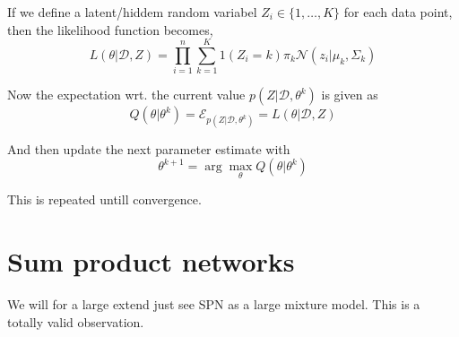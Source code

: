 If we define a latent/hiddem random variabel $Z_i \in \{1,\dots, K\}$ for each data point, then 
the likelihood function becomes, 
$$L(\theta|\mathcal{D}, Z) = \prod_{i=1}^n \sum_{k=1}^K 1(Z_i = k) \pi_k \mathcal{N}(z_i|\mu_k, \Sigma_k)$$

Now the expectation wrt. the current value $p(Z|\mathcal{D}, \theta^k)$ is given as 
$$Q(\theta|\theta^k) = \mathcal{E}_{p(Z|\mathcal{D}, \theta^k)}=L(\theta|\mathcal{D}, Z) $$

And then update the next parameter estimate with
$$\theta^{k+1} = \arg \max_{\theta} Q(\theta|\theta^k)$$

This is repeated untill convergence. 


\section{Sum product networks}
We will for a large extend just see SPN as a large mixture model. This is a totally valid observation. 

